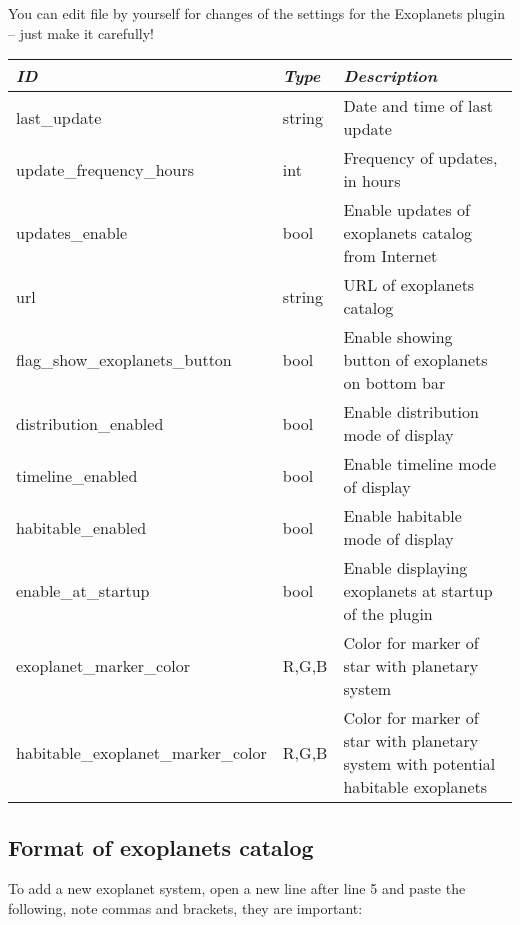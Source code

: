 You can edit  file by yourself for changes of the
settings for the Exoplanets plugin -- just make it carefully!

\begin{longtabu} to \textwidth {l|l|X}\toprule
\emph{ID}            & \emph{Type} & \emph{Description}\\\midrule
last\_update  & string & Date and time of last update \\\midrule
update\_frequency\_hours  & int & Frequency of updates, in hours \\\midrule
updates\_enable  & bool & Enable updates of exoplanets catalog from Internet \\\midrule
url  & string & URL of exoplanets catalog \\\midrule
flag\_show\_exoplanets\_button  & bool & Enable showing button of exoplanets on bottom bar \\\midrule
distribution\_enabled  & bool & Enable distribution mode of display \\\midrule
timeline\_enabled  & bool & Enable timeline mode of display \\\midrule
habitable\_enabled  & bool & Enable habitable mode of display \\\midrule
enable\_at\_startup  & bool & Enable displaying exoplanets at startup of the plugin \\\midrule
exoplanet\_marker\_color & R,G,B & Color for marker of star with planetary system \\\midrule
habitable\_exoplanet\_marker\_color  & R,G,B & Color for marker of star with planetary system with potential habitable exoplanets
 \\\bottomrule
\end{longtabu}

\newpage
\subsection{Format of exoplanets catalog}
\label{sec:plugins:Exoplanets:format}

To add a new exoplanet system, open a new line after line 5 and paste the following, note commas and brackets, they are important:

